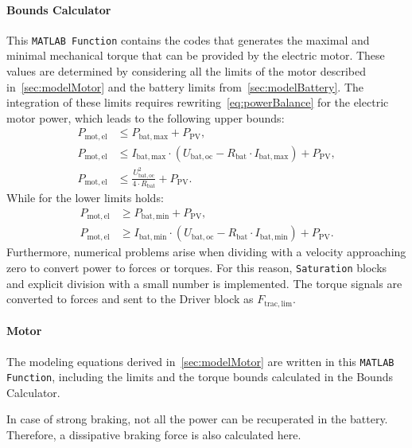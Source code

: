 \paragraph{Bounds Calculator}
This \texttt{MATLAB Function} contains the codes that generates the maximal and minimal mechanical torque that can be provided by the electric motor. These values are determined by considering all the limits of the motor described in~\cref{sec:modelMotor} and the battery limits from~\cref{sec:modelBattery}. The integration of these limits requires rewriting~\cref{eq:powerBalance} for the electric motor power, which leads to the following upper bounds:
\begin{align}
	P_\mathrm{mot,el} &\leq P_\mathrm{bat,max} + P_\mathrm{PV}, \\
	P_\mathrm{mot,el} &\leq I_\mathrm{bat,max} \cdot \left( U_\mathrm{bat,oc} - R_\mathrm{bat} \cdot I_\mathrm{bat,max} \right) + P_\mathrm{PV}, \\
	P_\mathrm{mot,el} &\leq \frac{U_\mathrm{bat,oc}^2}{4 \cdot R_\mathrm{bat}} + P_\mathrm{PV}.
\end{align}
While for the lower limits holds:
\begin{align}
	P_\mathrm{mot,el} &\geq P_\mathrm{bat,min} + P_\mathrm{PV}, \\
	P_\mathrm{mot,el} &\geq I_\mathrm{bat,min} \cdot \left( U_\mathrm{bat,oc} - R_\mathrm{bat} \cdot I_\mathrm{bat,min} \right) + P_\mathrm{PV}.
\end{align}
Furthermore, numerical problems arise when dividing with a velocity approaching zero to convert power to forces or torques. For this reason, \texttt{Saturation} blocks and explicit division with a small number is implemented. The torque signals are converted to forces and sent to the Driver block as $F_\mathrm{trac,lim}$.

\paragraph{Motor}
The modeling equations derived in~\cref{sec:modelMotor} are written in this \texttt{MATLAB Function}, including the limits and the torque bounds calculated in the Bounds Calculator.

In case of strong braking, not all the power can be recuperated in the battery. Therefore, a dissipative braking force is also calculated here.


